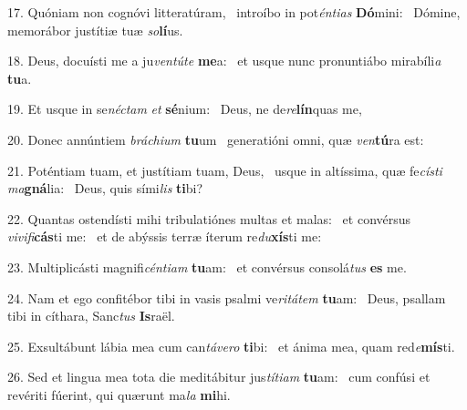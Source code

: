 17. Quóniam non cognóvi litteratúram, \dag\  introíbo in pot\textit{én}\textit{ti}\textit{as} \textbf{Dó}mini: \ast\  Dómine, memorábor justítiæ tuæ \textit{so}\textbf{lí}us.\

18. Deus, docuísti me a ju\textit{ven}\textit{tú}\textit{te} \textbf{me}a: \ast\  et usque nunc pronuntiábo mirabíli\textit{a} \textbf{tu}a.\

19. Et usque in se\textit{néc}\textit{tam} \textit{et} \textbf{sé}nium: \ast\  Deus, ne de\textit{re}\textbf{lín}quas me,\

20. Donec annúntiem \textit{brá}\textit{chi}\textit{um} \textbf{tu}um \ast\  generatióni omni, quæ \textit{ven}\textbf{tú}ra est:\

21. Poténtiam tuam, et justítiam tuam, Deus, \dag\  usque in altíssima, quæ fe\textit{cís}\textit{ti} \textit{ma}\textbf{gná}lia: \ast\  Deus, quis sími\textit{lis} \textbf{ti}bi?\

22. Quantas ostendísti mihi tribulatiónes multas et malas: \dag\  et convérsus \textit{vi}\textit{vi}\textit{fi}\textbf{cás}ti me: \ast\  et de abýssis terræ íterum re\textit{du}\textbf{xís}ti me:\

23. Multiplicásti magnifi\textit{cén}\textit{ti}\textit{am} \textbf{tu}am: \ast\  et convérsus consolá\textit{tus} \textbf{es} me.\

24. Nam et ego confitébor tibi in vasis psalmi ve\textit{ri}\textit{tá}\textit{tem} \textbf{tu}am: \ast\  Deus, psallam tibi in cíthara, Sanc\textit{tus} \textbf{Is}raël.\

25. Exsultábunt lábia mea cum can\textit{tá}\textit{ve}\textit{ro} \textbf{ti}bi: \ast\  et ánima mea, quam red\textit{e}\textbf{mís}ti.\

26. Sed et lingua mea tota die meditábitur jus\textit{tí}\textit{ti}\textit{am} \textbf{tu}am: \ast\  cum confúsi et revériti fúerint, qui quærunt ma\textit{la} \textbf{mi}hi.\

